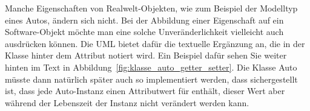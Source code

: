 \vspace{2mm} %

Manche 
Eigenschaften von Realwelt-Objekten, wie zum Beispiel der Modelltyp \mbox{eines} Autos, ändern sich nicht. Bei der Abbildung einer Eigenschaft auf ein Software-Objekt möchte man eine solche Unveränderlichkeit vielleicht auch ausdrücken können. Die UML bietet dafür die textuelle Ergänzung  an, die in der Klasse hinter dem Attribut notiert wird. Ein Beispiel dafür sehen Sie weiter hinten im Text in Abbildung~\ref{fig:klasse_auto_getter_setter}. Die Klasse Auto müsste dann natürlich später auch so implementiert werden, dass sichergestellt ist, dass jede Auto-Instanz einen Attributwert für  enthält, dieser Wert aber während der Lebenszeit der Instanz nicht verändert werden kann. 